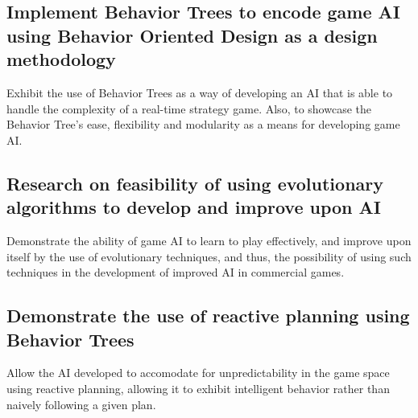     \subsection{Implement Behavior Trees to encode game AI using Behavior Oriented Design as a design methodology}
    
    Exhibit the use of Behavior Trees as a way of developing an AI that is able to handle the complexity of a real-time strategy game. Also, to showcase the Behavior Tree's ease, flexibility and modularity as a means for developing game AI.
    
    \subsection{Research on feasibility of using evolutionary algorithms to develop and improve upon AI}
    
    Demonstrate the ability of game AI to learn to play effectively, and improve upon itself by the use of evolutionary techniques, and thus, the possibility of using such techniques in the development of improved AI in commercial games.
    
    \subsection{Demonstrate the use of reactive planning using Behavior Trees}
    
    Allow the AI developed to accomodate for unpredictability in the game space using reactive planning, allowing it to exhibit intelligent behavior rather than naively following a given plan.
    
    

    

